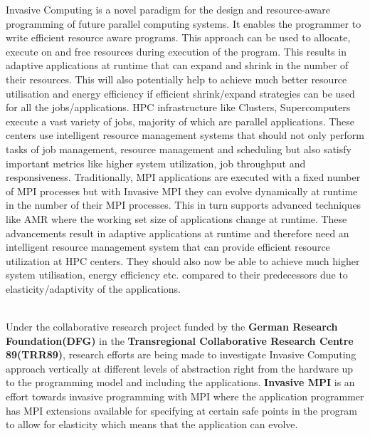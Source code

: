 Invasive Computing is a novel paradigm for the design and resource-aware programming of future parallel computing systems. It enables the programmer to write efficient resource aware programs. This approach can be used to allocate, execute on and free resources during execution of the program. This results in adaptive applications at runtime that can expand and shrink in the number of their resources. This will also potentially help to achieve much better resource utilisation and energy efficiency if efficient shrink/expand strategies can be used for all the jobs/applications. HPC infrastructure like Clusters, Supercomputers execute a vast variety of jobs, majority of which are parallel applications. These centers use intelligent resource management systems that should not only perform tasks of job management, resource management and scheduling but also satisfy important metrics like higher system utilization, job throughput and responsiveness. Traditionally, MPI applications are executed with a fixed number of MPI processes but with Invasive MPI they can evolve dynamically at runtime in the number of their MPI processes. This in turn supports advanced techniques like AMR where the working set size of applications change at runtime. These advancements result in adaptive applications at runtime and therefore need an intelligent resource management system that can provide efficient resource utilization at HPC centers. They should also now be able to achieve much higher system utilisation, energy efficiency etc. compared to their predecessors due to elasticity/adaptivity of the applications.\par
\noindent
\\Under the collaborative research project funded by the \textbf{German Research Foundation(DFG)} in the \textbf{Transregional Collaborative Research Centre 89(TRR89)}, research efforts are being made to investigate Invasive Computing approach vertically at different levels of abstraction right from the hardware up to the programming model and including the applications. \textbf{Invasive MPI} is an effort towards invasive programming with MPI where the application programmer has MPI extensions available for specifying at certain safe points in the program to allow for elasticity which means that the application can evolve.\\ \par

